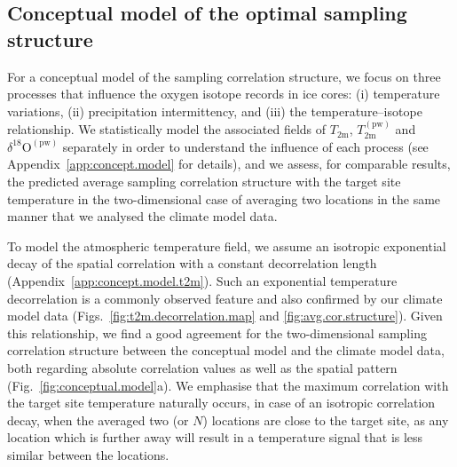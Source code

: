 \documentclass[cp, manuscript]{copernicus}
\begin{document}
\subsection{Conceptual model of the optimal sampling structure}
\label{discussion:concept.model}

For a conceptual model of the sampling correlation structure, we focus on three
processes that influence the oxygen isotope records in ice cores: (i)
temperature variations, (ii) precipitation intermittency, and (iii) the
temperature--isotope relationship. We statistically model the associated fields
of $T_{\mathrm{2m}}$, $T_{2\mathrm{m}}^{\mathrm{(pw)}}$ and
$\delta^{18}\mathrm{O}^{\mathrm{(pw)}}$ separately in order to understand the
influence of each process (see Appendix~\ref{app:concept.model} for details),
and we assess, for comparable results, the predicted average sampling
correlation structure with the target site temperature in the two-dimensional
case of averaging two locations in the same manner that we analysed the climate
model data.

To model the atmospheric temperature field, we assume an isotropic exponential
decay of the spatial correlation with a constant decorrelation length
(Appendix~\ref{app:concept.model.t2m}). Such an exponential temperature
decorrelation is a commonly observed feature \citep{Jones1997} and also
confirmed by our climate model data (Figs.~\ref{fig:t2m.decorrelation.map} and
\ref{fig:avg.cor.structure}). Given this relationship, we find a good
agreement for the two-dimensional sampling correlation structure between the
conceptual model and the climate model data, both regarding absolute correlation
values as well as the spatial pattern (Fig.~\ref{fig:conceptual.model}a). We
emphasise that the maximum correlation with the target site temperature
naturally occurs, in case of an isotropic correlation decay, when the averaged
two (or $N$) locations are close to the target site, as any location which is
further away will result in a temperature signal that is less similar between
the locations.
\end{document}
